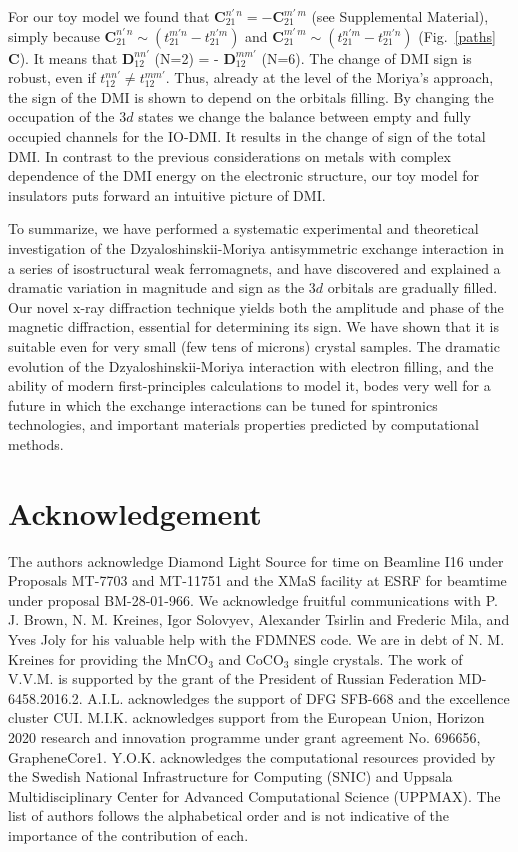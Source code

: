\documentclass[aps,prl,showpacs,reprint,floatfix]{revtex4-1}
\begin{document}
For our toy model we found that $\mathbf{C}_{21}^{n' \, n} = - \mathbf{C}_{21}^{m' \, m}$ (see Supplemental Material), simply because $\mathbf{C}_{21}^{n' \, n} \sim (t_{21}^{m'n} - t_{21}^{n'm})$  and  $\mathbf{C}_{21}^{m' \, m} \sim (t_{21}^{n'm} - t_{21}^{m'n})$ (Fig.~\ref{paths} $\mathbf C$).
It means that $\mathbf{D}^{nn'}_{12}$ (N=2) = - $\mathbf{D}^{mm'}_{12}$ (N=6). The change of DMI sign is robust, even if $t^{nn'}_{12} \ne t_{12}^{mm'}$. Thus, already at the level of the Moriya's approach, the sign of the DMI is shown to depend on the orbitals filling. 
By changing the occupation of the $3d$ states we change the balance between empty and fully occupied channels for the IO-DMI.
It results in the change of sign of the total DMI. In contrast to the previous considerations on metals \cite{PhysRevLett.44.1538,kashid,Belabbes} with complex dependence of the DMI energy on the electronic structure, our toy model for insulators puts forward an intuitive picture of DMI. 

To summarize, 
we have performed a systematic experimental and theoretical investigation of the Dzyaloshinskii-Moriya antisymmetric exchange interaction in a series of isostructural weak ferromagnets, 
and have discovered and explained a dramatic
variation in magnitude and sign as the $3d$ orbitals are gradually filled. Our novel x-ray diffraction technique yields both the amplitude and phase of the magnetic diffraction, essential for 
determining its sign. We have shown that it is suitable even for very small (few tens of microns) crystal samples. The dramatic evolution of the Dzyaloshinskii-Moriya interaction
with electron filling, and the ability of 
modern first-principles calculations to model it, bodes very well for a future in which the exchange interactions can be tuned for spintronics technologies, and important materials 
properties predicted by computational methods.

\section{Acknowledgement} 
The authors acknowledge Diamond Light Source for time on Beamline I16 under Proposals MT-7703 and MT-11751 and the XMaS facility at ESRF for beamtime under proposal BM-28-01-966.
We acknowledge fruitful communications with P. J. Brown, N. M. Kreines, Igor Solovyev, Alexander Tsirlin and Frederic Mila, and Yves Joly for his valuable help with the FDMNES code. 
We are in debt of N. M. Kreines for providing the MnCO$_3$ and CoCO$_3$ single crystals.
The work of V.V.M. is supported by the grant of the President of Russian Federation MD-6458.2016.2.
A.I.L. acknowledges the support of DFG  SFB-668 and the excellence cluster CUI. 
M.I.K. acknowledges support from the European Union, Horizon 2020 research and innovation programme under grant agreement No. 696656, GrapheneCore1.
Y.O.K. acknowledges the computational resources provided by the Swedish National Infrastructure for Computing (SNIC) and Uppsala Multidisciplinary Center for Advanced Computational Science (UPPMAX).
The list of authors follows the alphabetical order and is not indicative of the importance of the contribution of each.


%

\end{document}
